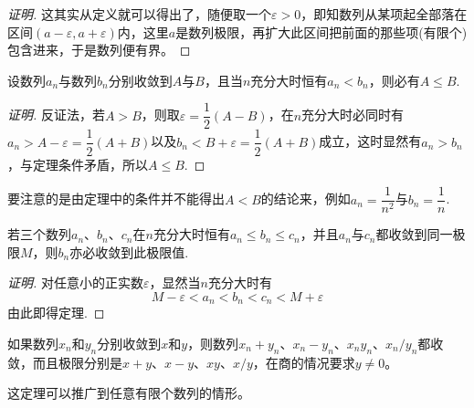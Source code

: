 \begin{proof}[证明]
  这其实从定义就可以得出了，随便取一个$\varepsilon>0$，即知数列从某项起全部落在区间$(a-\varepsilon, a+\varepsilon)$内，这里$a$是数列极限，再扩大此区间把前面的那些项(有限个)包含进来，于是数列便有界。
\end{proof}

\begin{theorem}[保不等式性]
  设数列$a_n$与数列$b_n$分别收敛到$A$与$B$，且当$n$充分大时恒有$a_n<b_n$，则必有$A \leqslant B$.
\end{theorem}

\begin{proof}[证明]
  反证法，若$A>B$，则取$\varepsilon=\dfrac{1}{2}(A-B)$，在$n$充分大时必同时有$a_n>A-\varepsilon=\dfrac{1}{2}(A+B)$以及$b_n<B+\varepsilon=\dfrac{1}{2}(A+B)$成立，这时显然有$a_n>b_n$，与定理条件矛盾，所以$A \leqslant B$.
\end{proof}

要注意的是由定理中的条件并不能得出$A<B$的结论来，例如$a_n=\dfrac{1}{n^2}$与$b_n=\dfrac{1}{n}$.

\begin{theorem}
 若三个数列$a_n$、$b_n$、$c_n$在$n$充分大时恒有$a_n \leqslant b_n \leqslant c_n$，并且$a_n$与$c_n$都收敛到同一极限$M$，则$b_n$亦必收敛到此极限值. 
\end{theorem}

\begin{proof}[证明]
  对任意小的正实数$\varepsilon$，显然当$n$充分大时有
  \[ M-\varepsilon < a_n < b_n < c_n < M+\varepsilon \]
  由此即得定理.
\end{proof}

\begin{theorem}
  如果数列$x_n$和$y_n$分别收敛到$x$和$y$，则数列$x_n+y_n$、$x_n-y_n$、$x_ny_n$、$x_n/y_n$都收敛，而且极限分别是$x+y$、$x-y$、$xy$、$x/y$，在商的情况要求$y \neq 0$。
\end{theorem}

这定理可以推广到任意有限个数列的情形。

